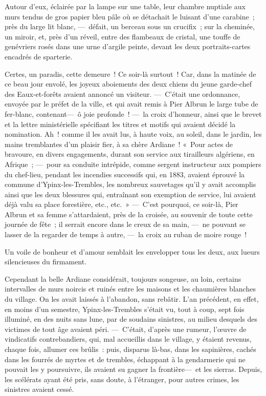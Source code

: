 \documentclass[french,twoside]{book} %
\begin{document}
   Autour d’eux, éclairée par la lampe sur une table, leur chambre nuptiale aux murs tendus de gros papier bleu pâle où se détachait le luisant d’une carabine ; près du large lit blanc, — défait, un berceau sous un crucifix ; sur la cheminée, un miroir, et, près d’un réveil, entre des flambeaux de cristal, une touffe de genévriers rosés dans une urne d’argile peinte, devant les deux portraits-cartes encadrés de sparterie.\par
Certes, un paradis, cette demeure ! Ce soir-là surtout ! Car, dans la matinée de ce beau jour envolé, les joyeux aboiements des deux chiens du jeune garde-chef des Eaux-et-forêts avaient annoncé un visiteur. — C’était une ordonnance, envoyée par le préfet de la ville, et qui avait remis à Pier Albrun le large tube de fer-blanc, contenant— ô joie profonde ! — la croix d’honneur, ainsi que le brevet et la lettre ministérielle spécifiant les titres et motifs qui avaient décidé la nomination. Ah ! comme il les avait lus, à haute voix, au soleil, dans le jardin, les mains tremblantes d’un plaisir fier, à sa chère Ardiane ! « Pour actes de bravoure, en divers engagements,   durant son service aux tirailleurs algériens, en Afrique ; — pour sa conduite intrépide, comme sergent instructeur aux pompiers du chef-lieu, pendant les incendies successifs qui, en 1883, avaient éprouvé la commune d’Ypinx-les-Trembles, les nombreux sauvetages qu’il y avait accomplis ainsi que les deux blessures qui, entraînant son exemption de service, lui avaient déjà valu sa place forestière, etc., etc. » — C’est pourquoi, ce soir-là, Pier Albrun et sa femme s’attardaient, près de la croisée, au souvenir de toute cette journée de fête ; il serrait encore dans le creux de sa main, — ne pouvant se lasser de la regarder de temps à autre, — la croix au ruban de moire rouge !\par
Un voile de bonheur et d’amour semblait les envelopper tous les deux, aux lueurs silencieuses du firmament.\par
Cependant la belle Ardiane considérait, toujours songeuse, au loin, certains intervalles de murs noircis et ruinés entre les maisons et les chaumières blanches du village. On les avait laissés   à l’abandon, sans rebâtir. L’an précédent, en effet, en moins d’un semestre, Ypinx-les-Trembles s’était vu, tout à coup, sept fois illuminé, en des nuits sans lune, par de soudains sinistres, au milieu desquels des victimes de tout âge avaient péri. — C’était, d’après une rumeur, l’œuvre de vindicatifs contrebandiers, qui, mal accueillis dans le village, y étaient revenus, chaque fois, allumer ces brûlis : puis, disparus là-bas, dans les sapinières, cachés dans les fourrés de myrtes et de trembles, échappant à la gendarmerie qui ne pouvait les y poursuivre, ils avaient su gagner la frontière— et les sierras. Depuis, les scélérats ayant été pris, sans doute, à l’étranger, pour autres crimes, les sinistres avaient cessé.\par
\end{document}
